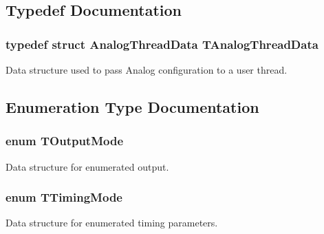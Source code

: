 \subsection{Typedef Documentation}
\hypertarget{group__main__module_gae5f40603a116adc42529ceedda6942c7}{}
\subsubsection[{T\+Analog\+Thread\+Data}]{\setlength{\rightskip}{0pt plus 5cm}typedef struct {\bf Analog\+Thread\+Data}  {\bf T\+Analog\+Thread\+Data}}\label{group__main__module_gae5f40603a116adc42529ceedda6942c7}


Data structure used to pass Analog configuration to a user thread. 



\subsection{Enumeration Type Documentation}
\hypertarget{group__main__module_ga14e126aa7db7e8318eb8d91d5e60f046}{}
\subsubsection[{T\+Output\+Mode}]{\setlength{\rightskip}{0pt plus 5cm}enum {\bf T\+Output\+Mode}}\label{group__main__module_ga14e126aa7db7e8318eb8d91d5e60f046}


Data structure for enumerated output. 

\hypertarget{group__main__module_ga145fb83eaa08eeccdac4c6bf2a0243b6}{}
\subsubsection[{T\+Timing\+Mode}]{\setlength{\rightskip}{0pt plus 5cm}enum {\bf T\+Timing\+Mode}}\label{group__main__module_ga145fb83eaa08eeccdac4c6bf2a0243b6}


Data structure for enumerated timing parameters. 



